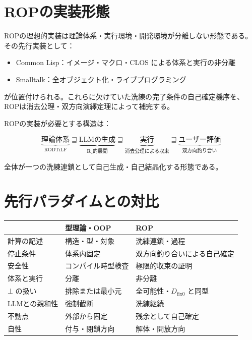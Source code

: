 \documentclass[11pt,a4paper]{article}
\theoremstyle{definition}
\newcommand{\dfix}{D_{\mathrm{fix}0}}
\newcommand{\Rmw}{\mathbf{R}_{\circ}}
\begin{document}
\section{ROPの実装形態}

ROPの理想的実装は理論体系・実行環境・開発環境が分離しない形態である。
その先行実装として：

\begin{itemize}
  \item Common Lisp：イメージ・マクロ・CLOS による体系と実行の非分離
  \item Smalltalk：全オブジェクト化・ライブプログラミング
\end{itemize}

が位置付けられる。これらに欠けていた洗練の完了条件の自己確定機序を、
ROPは消去公理・双方向演繹定理によって補完する。

ROPの実装が必要とする構造は：

\begin{equation}
\underbrace{\text{理論体系}}_{\text{RODTiLF}} \sqsupseteq
\underbrace{\text{LLMの生成}}_{\Rmw\text{的展開}} \sqsupseteq
\underbrace{\text{実行}}_{\text{消去公理による収束}} \sqsupseteq
\underbrace{\text{ユーザー評価}}_{\text{双方向釣り合い}}
\end{equation}

全体が一つの洗練連鎖として自己生成・自己結晶化する形態である。

\section{先行パラダイムとの対比}

\begin{center}
\begin{tabular}{lll}
\hline
& \textbf{型理論・OOP} & \textbf{ROP} \\
\hline
計算の記述 & 構造・型・対象 & 洗練連鎖・過程 \\
停止条件 & 体系内固定 & 双方向釣り合いによる自己確定 \\
安全性 & コンパイル時型検査 & 極限的収束の証明 \\
体系と実行 & 分離 & 非分離 \\
$\bot$ の扱い & 排除または最小元 & 全可能性・$\dfix$ と同型 \\
LLMとの親和性 & 強制截断 & 洗練継続 \\
不動点 & 外部から固定 & 残余として自己確定 \\
自性 & 付与・閉鎖方向 & 解体・開放方向 \\
\hline
\end{tabular}
\end{center}
\end{document}
